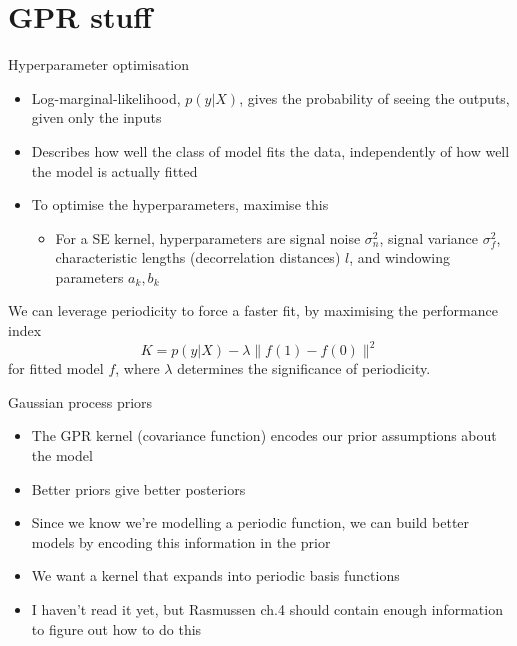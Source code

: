 \documentclass[presentation]{beamer}
\begin{document}
\section{GPR stuff}
\label{sec:org363e613}
\begin{frame}[label={sec:org9096923}]{Hyperparameter optimisation}
\begin{itemize}
\item Log-marginal-likelihood, \(p(y|X)\), gives the probability of seeing the outputs, given only the inputs
\item Describes how well the class of model fits the data, independently of how well the model is actually fitted
\item To optimise the hyperparameters, maximise this
\begin{itemize}
\item For a SE kernel, hyperparameters are signal noise \(\sigma^2_n\), signal variance \(\sigma^2_f\), characteristic lengths (decorrelation distances) \(l\), and windowing parameters \(a_k, b_k\)
\end{itemize}
\end{itemize}

We can leverage periodicity to force a faster fit, by maximising the performance index
\[K = p(y|X) - \lambda\|f(1) - f(0)\|^2\]
 for fitted model \(f\), where \(\lambda\) determines the significance of periodicity.
\end{frame}

\begin{frame}[label={sec:orgc4a00ad}]{Gaussian process priors}
\begin{itemize}
\item The GPR kernel (covariance function) encodes our prior assumptions about the model
\item Better priors give better posteriors
\item Since we know we're modelling a periodic function, we can build better models by encoding this information in the prior
\item We want a kernel that expands into periodic basis functions
\item I haven't read it yet, but Rasmussen ch.4 should contain enough information to figure out how to do this
\end{itemize}
\end{frame}
\end{document}
